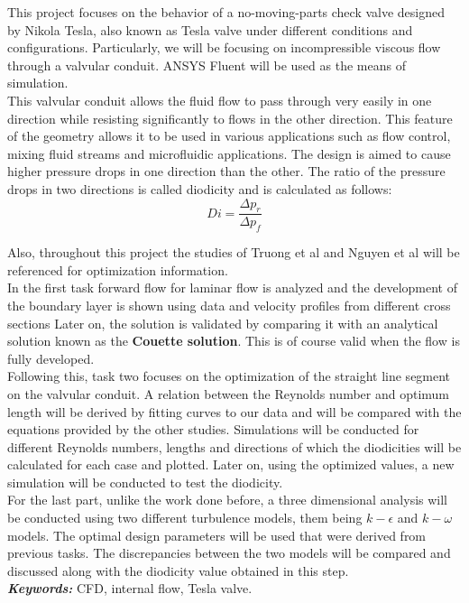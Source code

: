 This project focuses on the behavior of a no-moving-parts check valve designed by Nikola Tesla, also known as Tesla valve under different conditions and configurations. Particularly, we will be focusing on incompressible viscous flow through a valvular conduit. ANSYS Fluent will be used as the means of simulation. \\

This valvular conduit allows the fluid flow to pass through very easily in one direction while resisting significantly to flows in the other direction. This feature of the geometry allows it to be used in various applications such as flow control, mixing fluid streams and microfluidic applications. The design is aimed to cause higher pressure drops in one direction than the other. The ratio of the pressure drops in two directions is called diodicity and is calculated as follows:
\begin{equation}
    Di = \frac{\Delta p_r}{\Delta p_f}
\end{equation}

Also, throughout this project the studies of Truong et al \cite{truong} and Nguyen et al \cite{nguyen_abouezzi_ristroph_2021} will be referenced for optimization information.\\

In the first task forward flow for laminar flow is analyzed and the development of the boundary layer is shown using data and velocity profiles from different cross sections Later on, the solution is validated by comparing it with an analytical solution known as the \textbf{Couette solution}. This is of course valid when the flow is fully developed. \\

Following this, task two focuses on the optimization of the straight line segment on the valvular conduit. A relation between the Reynolds number and optimum length will be derived by fitting curves to our data and will be compared with the equations provided by the other studies. Simulations will be conducted for different Reynolds numbers, lengths and directions of which the diodicities will be calculated for each case and plotted. Later on, using the optimized values, a new simulation will be conducted to test the diodicity. \\

For the last part, unlike the work done before, a three dimensional analysis will be conducted using two different turbulence models, them being $k - \epsilon$ and $k - \omega$ models. The optimal design parameters will be used that were derived from previous tasks. The discrepancies between the two models will be compared and discussed along with the diodicity value obtained in this step. \\

\textbf{\textit{Keywords:}} CFD, internal flow, Tesla valve.
